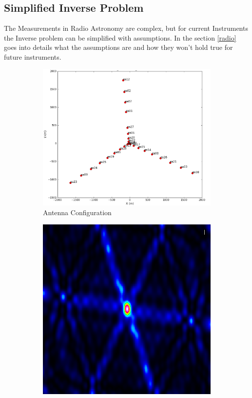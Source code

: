 \subsection{Simplified Inverse Problem}
The Measurements in Radio Astronomy are complex, but for current Instruments the Inverse problem can be simplified with assumptions. In the section \ref{radio} goes into details what the assumptions are and how they won't hold true for future instruments.

\begin{figure}[h!]
	\centering
	\begin{subfigure}[b]{0.3\linewidth}
		 \includegraphics[width=\linewidth]{./chapters/01.intro/img/antennas.png}
		 \caption{Antenna Configuration}
	\end{subfigure}
	\begin{subfigure}[b]{0.3\linewidth}
		\includegraphics[width=\linewidth]{./chapters/01.intro/img/PSF.png}

\end{subfigure}
\end{figure}
